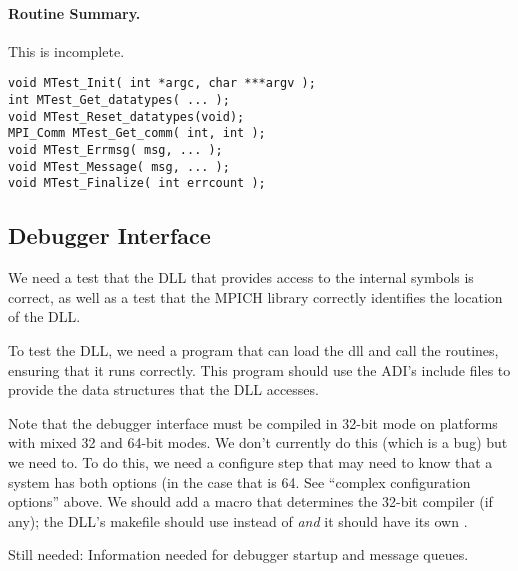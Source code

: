 \documentclass{article}
\begin{document}
\paragraph{Routine Summary.}
This is incomplete.
\begin{verbatim}
void MTest_Init( int *argc, char ***argv );
int MTest_Get_datatypes( ... );
void MTest_Reset_datatypes(void);
MPI_Comm MTest_Get_comm( int, int );
void MTest_Errmsg( msg, ... );
void MTest_Message( msg, ... );
void MTest_Finalize( int errcount );
\end{verbatim}

\subsection{Debugger Interface}
\label{sec:debug-interface}
We need a test that the DLL that provides access to the internal
symbols is correct, as well as a test that the MPICH library correctly
identifies the location of the DLL.

To test the DLL, we need a program  that can
load the dll and call the routines, ensuring that it runs correctly.
This program should use the ADI's include files to provide the data
structures that the DLL accesses.

Note that the debugger interface must be compiled in 32-bit mode on
platforms with mixed 32 and 64-bit modes.  We don't currently do this
(which is a bug) but we need to.  To do this, we need a configure step
that may need to know that a system has both options (in the case that
 is 64.  See ``complex configuration
options'' above.  We should add a macro  that
determines the 32-bit compiler (if any); the DLL's makefile should use
 instead of  \emph{and} it should have its own
. 

Still needed: Information needed for debugger startup and message
queues.


\end{document}
